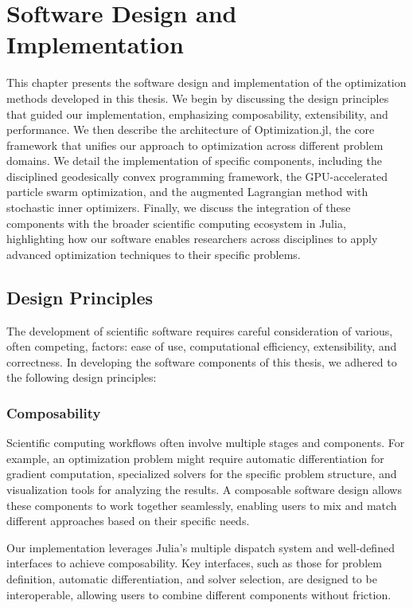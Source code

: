 \chapter{Software Design and Implementation}

This chapter presents the software design and implementation of the optimization methods developed in this thesis. We begin by discussing the design principles that guided our implementation, emphasizing composability, extensibility, and performance. We then describe the architecture of Optimization.jl, the core framework that unifies our approach to optimization across different problem domains. We detail the implementation of specific components, including the disciplined geodesically convex programming framework, the GPU-accelerated particle swarm optimization, and the augmented Lagrangian method with stochastic inner optimizers. Finally, we discuss the integration of these components with the broader scientific computing ecosystem in Julia, highlighting how our software enables researchers across disciplines to apply advanced optimization techniques to their specific problems.

\section{Design Principles}

The development of scientific software requires careful consideration of various, often competing, factors: ease of use, computational efficiency, extensibility, and correctness. In developing the software components of this thesis, we adhered to the following design principles:

\subsection{Composability}

Scientific computing workflows often involve multiple stages and components. For example, an optimization problem might require automatic differentiation for gradient computation, specialized solvers for the specific problem structure, and visualization tools for analyzing the results. A composable software design allows these components to work together seamlessly, enabling users to mix and match different approaches based on their specific needs.

Our implementation leverages Julia's multiple dispatch system and well-defined interfaces to achieve composability. Key interfaces, such as those for problem definition, automatic differentiation, and solver selection, are designed to be interoperable, allowing users to combine different components without friction.

